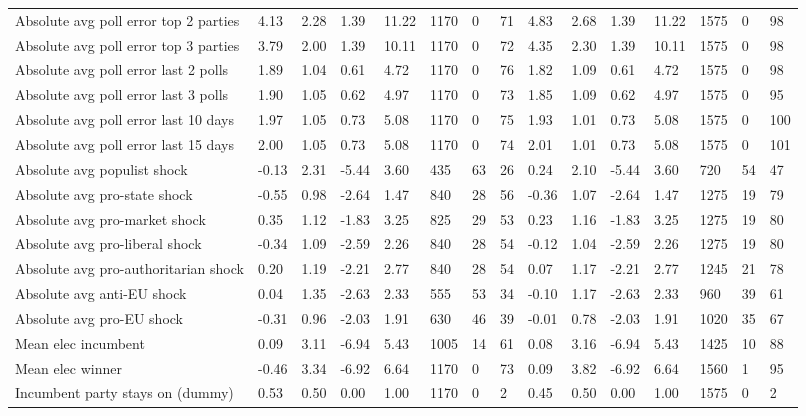 \begin{longtable}{lllllllllllllll}
Absolute avg poll error top 2 parties & 4.13 & 2.28 & 1.39 & 11.22 & 1170 & 0 & 71 & 4.83 & 2.68 & 1.39 & 11.22 & 1575 & 0 & 98\\
\addlinespace
Absolute avg poll error top 3 parties & 3.79 & 2.00 & 1.39 & 10.11 & 1170 & 0 & 72 & 4.35 & 2.30 & 1.39 & 10.11 & 1575 & 0 & 98\\
Absolute avg poll error last 2 polls & 1.89 & 1.04 & 0.61 & 4.72 & 1170 & 0 & 76 & 1.82 & 1.09 & 0.61 & 4.72 & 1575 & 0 & 98\\
Absolute avg poll error last 3 polls & 1.90 & 1.05 & 0.62 & 4.97 & 1170 & 0 & 73 & 1.85 & 1.09 & 0.62 & 4.97 & 1575 & 0 & 95\\
Absolute avg poll error last 10 days & 1.97 & 1.05 & 0.73 & 5.08 & 1170 & 0 & 75 & 1.93 & 1.01 & 0.73 & 5.08 & 1575 & 0 & 100\\
Absolute avg poll error last 15 days & 2.00 & 1.05 & 0.73 & 5.08 & 1170 & 0 & 74 & 2.01 & 1.01 & 0.73 & 5.08 & 1575 & 0 & 101\\
\addlinespace
Absolute avg populist shock & -0.13 & 2.31 & -5.44 & 3.60 & 435 & 63 & 26 & 0.24 & 2.10 & -5.44 & 3.60 & 720 & 54 & 47\\
Absolute avg pro-state shock & -0.55 & 0.98 & -2.64 & 1.47 & 840 & 28 & 56 & -0.36 & 1.07 & -2.64 & 1.47 & 1275 & 19 & 79\\
Absolute avg pro-market shock & 0.35 & 1.12 & -1.83 & 3.25 & 825 & 29 & 53 & 0.23 & 1.16 & -1.83 & 3.25 & 1275 & 19 & 80\\
Absolute avg pro-liberal shock & -0.34 & 1.09 & -2.59 & 2.26 & 840 & 28 & 54 & -0.12 & 1.04 & -2.59 & 2.26 & 1275 & 19 & 80\\
Absolute avg pro-authoritarian shock & 0.20 & 1.19 & -2.21 & 2.77 & 840 & 28 & 54 & 0.07 & 1.17 & -2.21 & 2.77 & 1245 & 21 & 78\\
\addlinespace
Absolute avg anti-EU shock & 0.04 & 1.35 & -2.63 & 2.33 & 555 & 53 & 34 & -0.10 & 1.17 & -2.63 & 2.33 & 960 & 39 & 61\\
Absolute avg pro-EU shock & -0.31 & 0.96 & -2.03 & 1.91 & 630 & 46 & 39 & -0.01 & 0.78 & -2.03 & 1.91 & 1020 & 35 & 67\\
Mean elec incumbent & 0.09 & 3.11 & -6.94 & 5.43 & 1005 & 14 & 61 & 0.08 & 3.16 & -6.94 & 5.43 & 1425 & 10 & 88\\
Mean elec winner & -0.46 & 3.34 & -6.92 & 6.64 & 1170 & 0 & 73 & 0.09 & 3.82 & -6.92 & 6.64 & 1560 & 1 & 95\\
Incumbent party stays on (dummy) & 0.53 & 0.50 & 0.00 & 1.00 & 1170 & 0 & 2 & 0.45 & 0.50 & 0.00 & 1.00 & 1575 & 0 & 2\\

\end{longtable}
